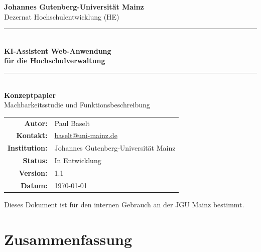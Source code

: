 \documentclass[12pt, a4paper]{article}
\begin{document}
\begin{titlepage}
  \centering
  \vspace*{1.5cm}

  {\Large\bfseries Johannes Gutenberg-Universität Mainz}\\[0.4cm]
  {\normalsize Dezernat Hochschulentwicklung (HE)}\\[2cm]

  \rule{\linewidth}{1.5pt}\\[0.4cm]
  {\LARGE\bfseries\color{jgublue} KI-Assistent Web-Anwendung\\[0.3cm] für die Hochschulverwaltung}\\[0.3cm]
  \rule{\linewidth}{1.5pt}\\[1.5cm]

  {\large\textbf{Konzeptpapier}}\\[0.5cm]
  {\normalsize Machbarkeitsstudie und Funktionsbeschreibung}\\[2.5cm]

  \begin{tabular}{rl}
    \textbf{Autor:}        & Paul Baselt \\
    \textbf{Kontakt:}      & \href{mailto:baselt@uni-mainz.de}{baselt@uni-mainz.de} \\
    \textbf{Institution:}  & Johannes Gutenberg-Universität Mainz \\
    \textbf{Status:}       & In Entwicklung \\
    \textbf{Version:}      & 1.1 \\
    \textbf{Datum:}        & \today \\
  \end{tabular}

  \vfill
  {\small\textcolor{jgugray}{Dieses Dokument ist für den internen Gebrauch an der JGU Mainz bestimmt.}}
\end{titlepage}

\tableofcontents
\newpage

\section{Zusammenfassung}
\end{document}
